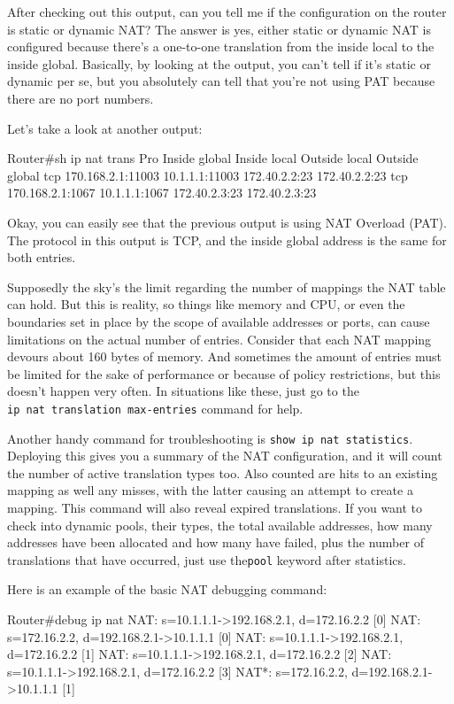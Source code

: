 After checking out this output, can you tell me if the configuration on
the router is static or dynamic NAT? The answer is yes, either static or
dynamic NAT is configured because there's a one-to-one translation from
the inside local to the inside global. Basically, by looking at the
output, you can't tell if it's static or dynamic per se, but you
absolutely can tell that you're not using PAT because there are no port
numbers.

Let's take a look at another output:

\begin{cli}
Router#sh ip nat trans
Pro Inside global      Inside local       Outside local      Outside global
tcp 170.168.2.1:11003  10.1.1.1:11003     172.40.2.2:23      172.40.2.2:23
tcp 170.168.2.1:1067   10.1.1.1:1067      172.40.2.3:23      172.40.2.3:23
\end{cli}

Okay, you can easily see that the previous output is using NAT Overload
(PAT). The protocol in this output is TCP, and the inside global address
is the same for both entries.

Supposedly the sky's the limit regarding the number of mappings the NAT
table can hold. But this is reality, so things like memory and CPU, or
even the boundaries set in place by the scope of available addresses or
ports, can cause limitations on the actual number of entries. Consider
that each NAT mapping devours about 160 bytes of memory. And sometimes
the amount of entries must be limited for the sake of performance or
because of policy restrictions, but this doesn't happen very often. In
situations like these, just go to the
\texttt{ip\ nat\ translation\ max-entries} command for help.

Another handy command for troubleshooting is
\texttt{show\ ip\ nat\ statistics}. Deploying this gives you a summary
of the NAT configuration, and it will count the number of active
translation types too. Also counted are hits to an existing mapping as
well any misses, with the latter causing an attempt to create a mapping.
This command will also reveal expired translations. If you want to check
into dynamic pools, their types, the total available addresses, how many
addresses have been allocated and how many have failed, plus the number
of translations that have occurred, just use the\texttt{pool} keyword
after statistics.

Here is an example of
the basic NAT debugging command:

\begin{cli}
Router#debug ip nat
NAT: s=10.1.1.1->192.168.2.1, d=172.16.2.2 [0]
NAT: s=172.16.2.2, d=192.168.2.1->10.1.1.1 [0]
NAT: s=10.1.1.1->192.168.2.1, d=172.16.2.2 [1]
NAT: s=10.1.1.1->192.168.2.1, d=172.16.2.2 [2]
NAT: s=10.1.1.1->192.168.2.1, d=172.16.2.2 [3]
NAT*: s=172.16.2.2, d=192.168.2.1->10.1.1.1 [1]
\end{cli}

